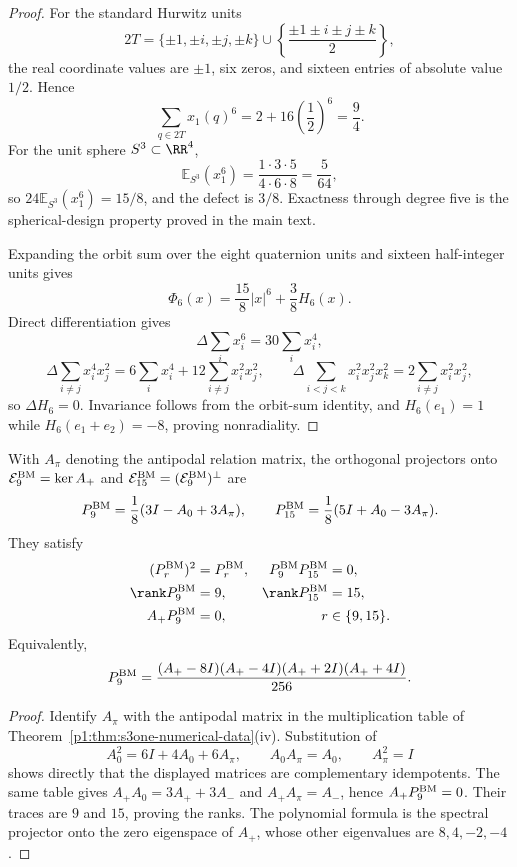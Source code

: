 \documentclass[11pt]{article}
\begin{document}
\begin{proof}
For the standard Hurwitz units
\[
2T=\{\pm1,\pm i,\pm j,\pm k\}
\cup
\left\{\frac{\pm1\pm i\pm j\pm k}{2}\right\},
\]
the real coordinate values are \(\pm1\), six zeros, and sixteen entries of
absolute value \(1/2\).  Hence
\[
  \sum_{q\in 2T}x_1(q)^6
  =2+16\left(\frac12\right)^6
  =\frac94.
\]
For the unit sphere \(S^3\subset\RR^4\),
\[
  \mathbb E_{S^3}(x_1^6)
  =\frac{1\cdot3\cdot5}{4\cdot6\cdot8}
  =\frac5{64},
\]
so \(24\mathbb E_{S^3}(x_1^6)=15/8\), and the defect is \(3/8\).
Exactness through degree five is the spherical-design property proved in the
main text.

Expanding the orbit sum over the eight quaternion units and sixteen
half-integer units gives
\[
 \Phi_6(x)=\frac{15}{8}|x|^6+\frac38H_6(x).
\]
Direct differentiation gives
\[
 \Delta\sum_i x_i^6=30\sum_i x_i^4,
\]
\[
 \Delta\sum_{i\ne j}x_i^4x_j^2
 =6\sum_i x_i^4+12\sum_{i\ne j}x_i^2x_j^2,
 \qquad
 \Delta\sum_{i<j<k}x_i^2x_j^2x_k^2
 =2\sum_{i\ne j}x_i^2x_j^2,
\]
so \(\Delta H_6=0\).  Invariance follows from the orbit-sum identity, and
\(H_6(e_1)=1\) while \(H_6(e_1+e_2)=-8\), proving nonradiality.
\end{proof}

\begin{corollary}
\label{p1:cor:math-twentyfourcell-explicit-projectors}
With \(A_\pi\) denoting the antipodal relation matrix, the orthogonal
projectors onto \(\mathcal E_9^{\rm BM}=\ker A_+\) and
\(\mathcal E_{15}^{\rm BM}=(\mathcal E_9^{\rm BM})^\perp\) are
\[
 P_9^{\rm BM}=\frac18(3I-A_0+3A_\pi),
 \qquad
 P_{15}^{\rm BM}=\frac18(5I+A_0-3A_\pi).
\]
They satisfy
\[
\begin{aligned}
(P_r^{\rm BM})^2&=P_r^{\rm BM},&
P_9^{\rm BM}P_{15}^{\rm BM}&=0,\\
\rank P_9^{\rm BM}&=9,&
\rank P_{15}^{\rm BM}&=15,\\
 A_+P_9^{\rm BM}&=0,&
 r&\in\{9,15\}.
\end{aligned}
\]
Equivalently,
\[
 P_9^{\rm BM}
 =\frac{(A_+-8I)(A_+-4I)(A_++2I)(A_++4I)}{256}.
\]
\end{corollary}

\begin{proof}
Identify \(A_\pi\) with the antipodal matrix in the multiplication table of
Theorem~\ref{p1:thm:s3one-numerical-data}\textup{(iv)}.  Substitution of
\[
A_0^2=6I+4A_0+6A_\pi,\qquad
A_0A_\pi=A_0,\qquad A_\pi^2=I
\]
shows directly that the displayed matrices are complementary idempotents.
The same table gives \(A_+A_0=3A_++3A_-\) and \(A_+A_\pi=A_-\), hence
\(A_+P_9^{\rm BM}=0\).  Their traces are \(9\) and \(15\), proving the
ranks.  The polynomial formula is the spectral projector onto the zero
eigenspace of \(A_+\), whose other eigenvalues are \(8,4,-2,-4\).
\end{proof}
\end{document}
